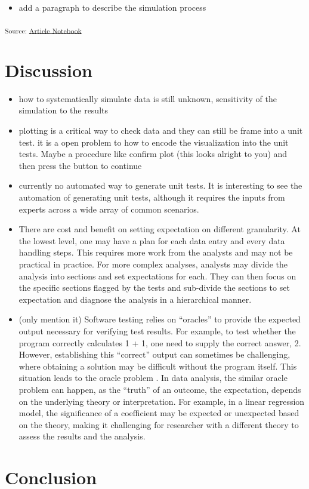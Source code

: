 \documentclass[
]{jds}
\providecommand{\tightlist}{%
  \setlength{\itemsep}{0pt}\setlength{\parskip}{0pt}}\usepackage{longtable,booktabs,array}
\begin{document}
\begin{itemize}
\tightlist
\item
  add a paragraph to describe the simulation process
\end{itemize}

\textsubscript{Source:
\href{https://huizezhang-sherry.github.io/paper-analysis-plan/index.qmd.html}{Article
Notebook}}

\section{Discussion}\label{discussion}

\begin{itemize}
\item
  how to systematically simulate data is still unknown, sensitivity of
  the simulation to the results
\item
  plotting is a critical way to check data and they can still be frame
  into a unit test. it is a open problem to how to encode the
  visualization into the unit tests. Maybe a procedure like confirm plot
  (this looks alright to you) and then press the button to continue
\item
  currently no automated way to generate unit tests. It is interesting
  to see the automation of generating unit tests, although it requires
  the inputs from experts across a wide array of common scenarios.
\item
  There are cost and benefit on setting expectation on different
  granularity. At the lowest level, one may have a plan for each data
  entry and every data handling steps. This requires more work from the
  analysts and may not be practical in practice. For more complex
  analyses, analysts may divide the analysis into sections and set
  expectations for each. They can then focus on the specific sections
  flagged by the tests and sub-divide the sections to set expectation
  and diagnose the analysis in a hierarchical manner.
\item
  (only mention it) Software testing relies on ``oracles'' to provide
  the expected output necessary for verifying test results. For example,
  to test whether the program correctly calculates 1 + 1, one need to
  supply the correct answer, 2. However, establishing this ``correct''
  output can sometimes be challenging, where obtaining a solution may be
  difficult without the program itself. This situation leads to the
  oracle problem \citep{barr2014oracle}. In data analysis, the similar
  oracle problem can happen, as the ``truth'' of an outcome, the
  expectation, depends on the underlying theory or interpretation. For
  example, in a linear regression model, the significance of a
  coefficient may be expected or unexpected based on the theory, making
  it challenging for researcher with a different theory to assess the
  results and the analysis.
\end{itemize}

\section{Conclusion}\label{sec-conclusion}


\renewcommand\refname{References}
  
\end{document}
